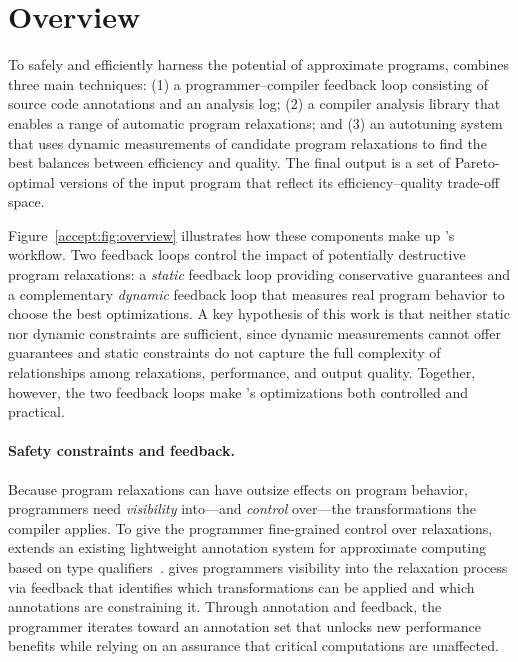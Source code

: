 \section{Overview}


To safely and efficiently harness the potential of approximate programs,
\sysname combines three main techniques: (1) a programmer--compiler
feedback loop consisting of source code annotations and an analysis log; (2) a
compiler analysis library
that enables a range of automatic program relaxations; and (3) an autotuning
system that uses dynamic measurements of candidate program relaxations to find
the best balances between efficiency and quality. The final output is a set of
Pareto-optimal versions of the input program that reflect its
efficiency--quality trade-off space.

Figure~\ref{accept:fig:overview} illustrates
how these components make up \sysname's workflow.
Two feedback loops control the impact of
potentially destructive program relaxations: a \emph{static} feedback loop
providing
conservative guarantees
and a complementary \emph{dynamic} feedback loop that measures real
program behavior to choose the best optimizations.
%
A key hypothesis of this work is that neither static nor dynamic constraints
are sufficient, since dynamic measurements cannot offer guarantees and static
constraints do not capture the full complexity of relationships among
relaxations, performance, and output quality. Together, however, the two
feedback loops make \sysname's optimizations both controlled and practical.
%

\paragraph{Safety constraints and feedback.}
Because program relaxations can have outsize effects on program behavior,
programmers need \emph{visibility} into---and \emph{control} over---the
transformations the compiler applies.
%
To give the programmer fine-grained control over relaxations, \sysname extends
an existing lightweight annotation system for approximate computing based on
type qualifiers~\cite{enerj}.
%
\sysname gives programmers visibility into the relaxation process via feedback
that identifies which transformations can be applied and which annotations are
constraining it.  Through annotation and feedback, the programmer iterates
toward an annotation set that unlocks new performance benefits while relying on
an assurance that critical computations are unaffected.

